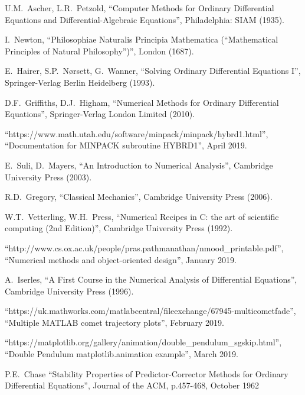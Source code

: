 \documentclass[12pt, twoside]{report}
\theoremstyle{plain}
\theoremstyle{definition}
\theoremstyle{definition}
\begin{document}
\begin{thebibliography}{50}
        U.M.~Ascher, L.R.~Petzold,
        ``Computer Methods for Ordinary Differential Equations and 
        Differential-Algebraic Equations'',
        Philadelphia: SIAM (1935).

        I.~Newton,
        ``Philosophiae Naturalis Principia Mathematica (“Mathematical
        Principles of Natural Philosophy”)'',
        London (1687).

        E.~Hairer, S.P.~N{\o}rsett, G.~Wanner,
        ``Solving Ordinary Differential Equations I'',
        Springer-Verlag Berlin Heidelberg (1993).

        D.F.~Griffiths, D.J.~Higham,
        ``Numerical Methods for Ordinary Differential Equations'',
        Springer-Verlag London Limited (2010).

        ``https://www.math.utah.edu/software/minpack/minpack/hybrd1.html'', 
        ``Documentation for MINPACK subroutine HYBRD1'',
        April 2019.

        E.~Suli, D.~Mayers,
        ``An Introduction to Numerical Analysis'',
        Cambridge University Press (2003).

        R.D.~Gregory,
        ``Classical Mechanics'',
        Cambridge University Press (2006).

        W.T.~Vetterling, W.H.~Press,
        ``Numerical Recipes in C: the art of scientific computing (2nd 
        Edition)'',
        Cambridge University Press (1992).

        ``http://www.cs.ox.ac.uk/people/pras.pathmanathan/nmood\_printable.pdf'',
        ``Numerical methods and object-oriented design'',
        January 2019.

        A.~Iserles,
        ``A First Course in the Numerical Analysis of Differential Equations'',
        Cambridge University Press (1996).

        ``https://uk.mathworks.com/matlabcentral/fileexchange/67945-multicometfade'',
        ``Multiple MATLAB comet trajectory plots'',
        February 2019.

        ``https://matplotlib.org/gallery/animation/double\_pendulum\_sgskip.html'',
        ``Double Pendulum matplotlib.animation example'',
        March 2019.

        P.E.~Chase
        ``Stability Properties of Predictor-Corrector Methods for Ordinary 
        Differential Equations'',
        Journal of the ACM, p.457-468, October 1962

\end{thebibliography}
\end{document}
